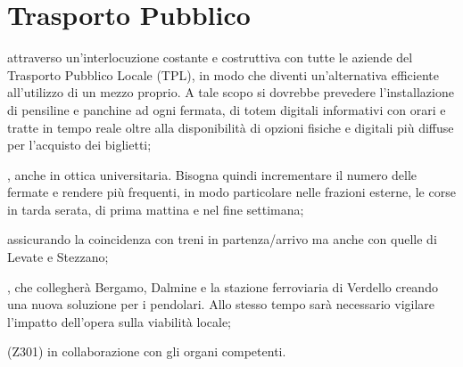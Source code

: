 \section{Trasporto Pubblico}
 attraverso un'interlocuzione costante e costruttiva con tutte le aziende del Trasporto Pubblico Locale (TPL), in modo che diventi un'alternativa efficiente all'utilizzo di un mezzo proprio. A tale scopo si dovrebbe prevedere l'installazione di pensiline e panchine ad ogni fermata, di totem digitali informativi con orari e tratte in tempo reale oltre alla disponibilità di opzioni fisiche e digitali più diffuse per l'acquisto dei biglietti;

, anche in ottica universitaria. Bisogna quindi incrementare il numero delle fermate e rendere più frequenti, in modo particolare nelle frazioni esterne, le corse in tarda serata, di prima mattina e nel fine settimana; 

 assicurando la coincidenza con treni in partenza/arrivo ma anche con quelle di Levate e Stezzano;

, che collegherà Bergamo, Dalmine e la stazione ferroviaria di Verdello creando una nuova soluzione per i pendolari. Allo stesso tempo sarà necessario vigilare l'impatto dell'opera sulla viabilità locale;

 (Z301) in collaborazione con gli organi competenti. 
